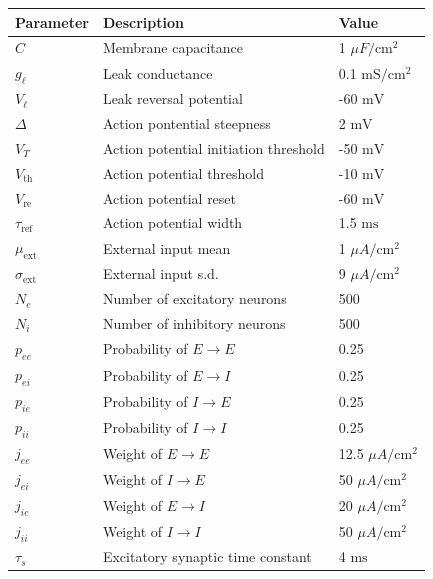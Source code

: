 \documentclass{ucetd}
\begin{document}
\clearpage
\begin{center}
    \begin{tabular}{ | p{4cm} p{7cm} p{4cm} |}
    \hline
    Parameter & Description & Value \\ \hline
    $C$ & Membrane capacitance & 1 $\mu F/\mathrm{cm}^{2}$ \\
    $g_{\ell}$ & Leak conductance & 0.1 $\mathrm{mS}/\mathrm{cm}^{2}$\\
    $V_{\ell}$ & Leak reversal potential & -60 $\mathrm{mV}$ \\
    $\Delta$ & Action pontential steepness & 2 $\mathrm{mV}$ \\
    $V_{T}$ & Action potential initiation threshold & -50 $\mathrm{mV}$ \\
    $V_{\mathrm{th}}$ & Action potential threshold & -10 $\mathrm{mV}$ \\
    $V_{\mathrm{re}}$ & Action potential reset & -60 $\mathrm{mV}$ \\
    $\tau_{\mathrm{ref}}$ & Action potential width & 1.5 $\mathrm{ms}$ \\
    $\mu_{\mathrm{ext}}$ & External input mean & 1 $\mu A/\mathrm{cm}^{2}$ \\
    $\sigma_{\mathrm{ext}}$ & External input s.d. & 9 $\mu A/\mathrm{cm}^{2}$ \\
    $N_{e}$ & Number of excitatory neurons & 500 \\
    $N_{i}$ & Number of inhibitory neurons & 500 \\
    $p_{ee}$ & Probability of $E\rightarrow E$ & 0.25 \\
    $p_{ei}$ & Probability of $E\rightarrow I$ & 0.25 \\
    $p_{ie}$ & Probability of $I\rightarrow E$ & 0.25 \\
    $p_{ii}$ & Probability of $I\rightarrow I$ & 0.25 \\
    $j_{ee}$ & Weight of $E\rightarrow E$ & 12.5 $\mu A/\mathrm{cm}^{2}$ \\
    $j_{ei}$ & Weight of $I\rightarrow E$ & 50 $\mu A/\mathrm{cm}^{2}$\\
    $j_{ie}$ & Weight of $E\rightarrow I$ & 20 $\mu A/\mathrm{cm}^{2}$ \\
    $j_{ii}$ & Weight of $I\rightarrow I$ & 50 $\mu A/\mathrm{cm}^{2}$\\
    $\tau_{s}$ & Excitatory synaptic time constant & 4 $\mathrm{ms}$\\
    \hline

    \end{tabular}
\end{center}
\end{document}
